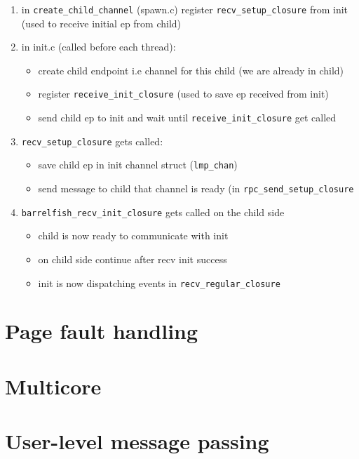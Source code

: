 \documentclass[11pt,a4paper]{report}
\begin{document}
\begin{enumerate}
    \item in \verb|create_child_channel| (spawn.c) register
    \verb|recv_setup_closure| from init
    (used to receive initial ep from child)

    \item in init.c (called before each thread): 
        \begin{itemize}
            \item create child endpoint i.e channel for this child (we are already in child)
            \item register \verb|receive_init_closure| (used to save ep received from init)
            \item send child ep to init and wait until
            \verb|receive_init_closure| get called
        \end{itemize}
    \item \verb|recv_setup_closure| gets called:
        \begin{itemize} 
            \item save child ep in init channel struct (\verb|lmp_chan|)
            \item send message to child that channel is ready (in
            \verb|rpc_send_setup_closure|
        \end{itemize}
    \item \verb|barrelfish_recv_init_closure| gets called on the child side
        \begin{itemize}
            \item child is now ready to communicate with init
            \item on child side continue after recv init success
            \item init is now dispatching events in \verb|recv_regular_closure|
        \end{itemize}
\end{enumerate}

\chapter{Page fault handling}

\chapter{Multicore}

\chapter{User-level message passing}
\end{document}
